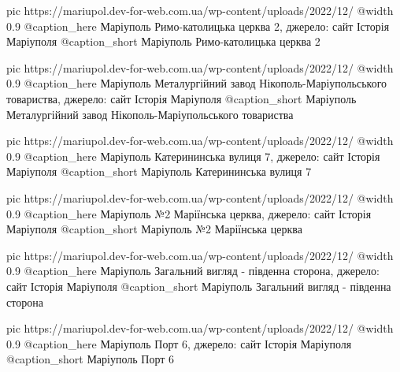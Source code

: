 	pic https://mariupol.dev-for-web.com.ua/wp-content/uploads/2022/12/%
	@width 0.9
	@caption_here Маріуполь Римо-католицька церква 2, джерело: сайт Історія Маріуполя
	@caption_short Маріуполь Римо-католицька церква 2

	pic https://mariupol.dev-for-web.com.ua/wp-content/uploads/2022/12/%
	@width 0.9
	@caption_here Маріуполь Металургійний завод Нікополь-Маріупольського товариства, джерело: сайт Історія Маріуполя
	@caption_short Маріуполь Металургійний завод Нікополь-Маріупольського товариства

	pic https://mariupol.dev-for-web.com.ua/wp-content/uploads/2022/12/%
	@width 0.9
	@caption_here Маріуполь Катерининська вулиця 7, джерело: сайт Історія Маріуполя
	@caption_short Маріуполь Катерининська вулиця 7

	pic https://mariupol.dev-for-web.com.ua/wp-content/uploads/2022/12/%
	@width 0.9
	@caption_here Маріуполь №2 Маріїнська церква, джерело: сайт Історія Маріуполя
	@caption_short Маріуполь №2 Маріїнська церква

	pic https://mariupol.dev-for-web.com.ua/wp-content/uploads/2022/12/%
	@width 0.9
	@caption_here Маріуполь Загальний вигляд - південна сторона, джерело: сайт Історія Маріуполя
	@caption_short Маріуполь Загальний вигляд - південна сторона

	pic https://mariupol.dev-for-web.com.ua/wp-content/uploads/2022/12/%
	@width 0.9
	@caption_here Маріуполь Порт 6, джерело: сайт Історія Маріуполя
	@caption_short Маріуполь Порт 6

